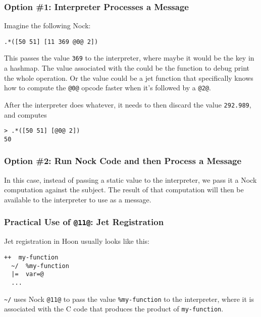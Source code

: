 \documentclass[twoside]{article}
\begin{document}
\subsubsection{Option \#1: Interpreter Processes a Message}

Imagine the following Nock:

\begin{lstlisting}[style=listingcode]
.*([50 51] [11 369 @0@ 2])
\end{lstlisting}

\noindent{}
This passes the value \lstinline[style=inlinecode]{369} to the interpreter, where maybe it would be the key in a hashmap. The value associated with the could be the function to debug print the whole operation. Or the value could be a jet function that specifically knows how to compute the \lstinline[style=inlinecode]{@0@} opcode faster when it's followed by a \lstinline[style=inlinecode]{@2@}.

After the interpreter does whatever, it needs to then discard the value \lstinline[style=inlinecode]{292.989}, and computes

\begin{lstlisting}[style=listingcode]
> .*([50 51] [@0@ 2])
50
\end{lstlisting}

\subsubsection{Option \#2: Run Nock Code and then Process a Message}

In this case, instead of passing a static value to the interpreter, we pass it a Nock computation against the subject. The result of that computation will then be available to the interpreter to use as a message.

\subsubsection{Practical Use of \lstinline[style=inlinecode]{@11@}: Jet Registration}

Jet registration in Hoon usually looks like this:

\begin{lstlisting}[style=listingcode]
++  my-function
  ~/  %my-function
  |=  var=@
  ...
\end{lstlisting}

\lstinline[style=inlinecode]{~/} uses Nock \lstinline[style=inlinecode]{@11@} to pass the value \lstinline[style=inlinecode]{%my-function} to the interpreter, where it is associated with the C code that produces the product of \lstinline[style=inlinecode]{my-function}.
\end{document}
